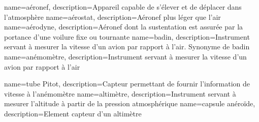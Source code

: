 {
    name=aéronef,
    description={Appareil capable de s'élever et de déplacer dans l'atmosphère}
}
{
    name=aérostat,
    description={Aéronef plus léger que l'air}
}
{
    name=aérodyne,
    description={Aéronef dont la sustentation est assurée par la portance d'une voilure fixe ou tournante}
}
{
    name=badin,
    description={Instrument servant à mesurer la vitesse d'un avion par rapport à l'air. Synonyme de badin}
}
{
    name=anémomètre,
    description={Instrument servant à mesurer la vitesse d'un avion par rapport à l'air}
}

{
    name=tube Pitot,
    description={Capteur permettant de fournir l'information de vitesse à l'anémomètre}
}
{
    name=altimètre,
    description={Instrument servant à mesurer l'altitude à partir de la pression atmosphérique}
}
{
    name=capsule anéroïde,
    description={Element capteur d'un altimètre}
}




